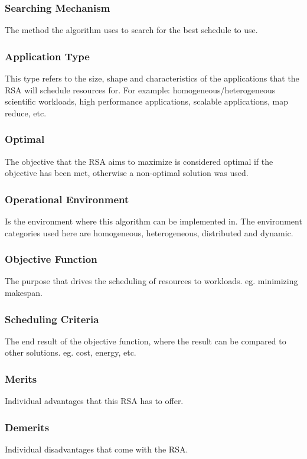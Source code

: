 \documentclass[12pt]{article}
\begin{document}
\subsubsection{Searching Mechanism} The method the algorithm uses to search for the best schedule to use.

\subsubsection{Application Type} This type refers to the size, shape and characteristics of the applications that the RSA will schedule resources for. For example: homogeneous/heterogeneous scientific workloads, high performance applications, scalable applications, map reduce, etc.

\subsubsection{Optimal} The objective that the RSA aims to maximize is considered optimal if the objective has been met, otherwise a non-optimal solution was used.

\subsubsection{Operational Environment} Is the environment where this algorithm can be implemented in. The environment categories used here are homogeneous, heterogeneous, distributed and dynamic.

\subsubsection{Objective Function} The purpose that drives the scheduling of resources to workloads. eg. minimizing makespan.

\subsubsection{Scheduling Criteria} The end result of the objective function, where the result can be compared to other solutions. eg. cost, energy, etc.

\subsubsection{Merits} Individual advantages that this RSA has to offer.

\subsubsection{Demerits} Individual disadvantages that come with the RSA.
\end{document}
